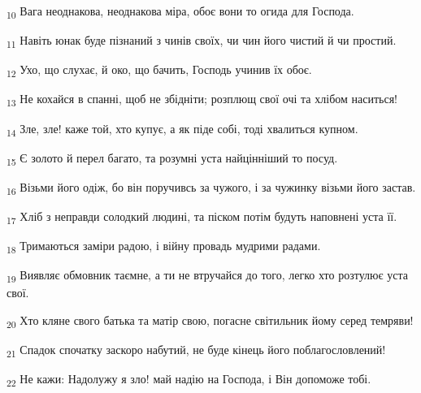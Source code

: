 \begin{tcolorbox}
\textsubscript{10} Вага неоднакова, неоднакова міра, обоє вони то огида для Господа.
\end{tcolorbox}
\begin{tcolorbox}
\textsubscript{11} Навіть юнак буде пізнаний з чинів своїх, чи чин його чистий й чи простий.
\end{tcolorbox}
\begin{tcolorbox}
\textsubscript{12} Ухо, що слухає, й око, що бачить, Господь учинив їх обоє.
\end{tcolorbox}
\begin{tcolorbox}
\textsubscript{13} Не кохайся в спанні, щоб не збідніти; розплющ свої очі та хлібом наситься!
\end{tcolorbox}
\begin{tcolorbox}
\textsubscript{14} Зле, зле! каже той, хто купує, а як піде собі, тоді хвалиться купном.
\end{tcolorbox}
\begin{tcolorbox}
\textsubscript{15} Є золото й перел багато, та розумні уста найцінніший то посуд.
\end{tcolorbox}
\begin{tcolorbox}
\textsubscript{16} Візьми його одіж, бо він поручивсь за чужого, і за чужинку візьми його застав.
\end{tcolorbox}
\begin{tcolorbox}
\textsubscript{17} Хліб з неправди солодкий людині, та піском потім будуть наповнені уста її.
\end{tcolorbox}
\begin{tcolorbox}
\textsubscript{18} Тримаються заміри радою, і війну провадь мудрими радами.
\end{tcolorbox}
\begin{tcolorbox}
\textsubscript{19} Виявляє обмовник таємне, а ти не втручайся до того, легко хто розтулює уста свої.
\end{tcolorbox}
\begin{tcolorbox}
\textsubscript{20} Хто кляне свого батька та матір свою, погасне світильник йому серед темряви!
\end{tcolorbox}
\begin{tcolorbox}
\textsubscript{21} Спадок спочатку заскоро набутий, не буде кінець його поблагословлений!
\end{tcolorbox}
\begin{tcolorbox}
\textsubscript{22} Не кажи: Надолужу я зло! май надію на Господа, і Він допоможе тобі.
\end{tcolorbox}
